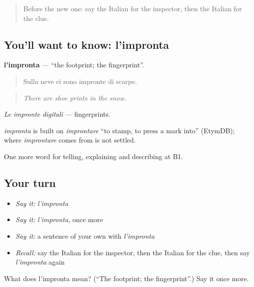 \label{lesson:IT-C295-impronta}



\begin{quote}
Before the new one: say the Italian for the inspector, then the Italian for the clue.
\end{quote}

\subsection*{You'll want to know: l'impronta}
\textbf{l'impronta} — \textquotedblleft{}the footprint; the fingerprint\textquotedblright{}.

\begin{quote}
Sulla neve ci sono impronte di scarpe.
\end{quote}

\begin{quote}
\emph{There are shoe prints in the snow.}
\end{quote}

\emph{Le impronte digitali} — fingerprints.

\begin{cousinweb}
\emph{impronta} is built on \emph{improntare} \textquotedblleft{}to stamp, to press a mark into\textquotedblright{} (EtymDB); where \emph{improntare} comes from is not settled.
\end{cousinweb}

\begin{grammarlens}[title={What you've built}]
One more word for telling, explaining and describing at B1.
\end{grammarlens}

\subsection*{Your turn}
\begin{itemize}
\raggedright
  \item \emph{Say it:} \emph{l'impronta}
  \item \emph{Say it:} \emph{l'impronta}, once more
  \item \emph{Say it:} a sentence of your own with \emph{l'impronta}
  \item \emph{Recall:} say the Italian for the inspector, then the Italian for the clue, then say \emph{l'impronta} again
\end{itemize}

\begin{tcolorbox}[breakable,colback=teal!4,colframe=teal!35!black,title={Before you move on}]
What does l'impronta mean? (\textquotedblleft{}The footprint; the fingerprint\textquotedblright{}.) Say it once more.
\end{tcolorbox}
